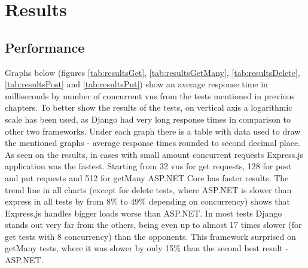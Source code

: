 
\chapter{Results}\label{cha:results}

\section{Performance}

Graphs below (figures \ref{tab:resultsGet}, \ref{tab:resultsGetMany}, \ref{tab:resultsDelete}, \ref{tab:resultsPost} and \ref{tab:resultsPut}) show an average response time in milliseconds by number of concurrent \acrshort{vu}s from the tests mentioned in previous chapters. To better show the results of the tests, on vertical axis a logarithmic scale has been used, as Django had very long response times in comparison to other two frameworks. Under each graph there is a table with data used to draw the mentioned graphs - average response times rounded to second decimal place. As seen on the results, in cases with small amount concurrent requests Express.js application was the fastest. Starting from 32 \acrlong{vu}s for get requests, 128 for post and put requests and 512 for getMany ASP.NET Core has faster results. The trend line in all charts (except for delete tests, where ASP.NET is slower than express in all tests by from 8\% to 49\% depending on concurrency) shows that Express.js handles bigger loads worse than ASP.NET. In most tests Django stands out very far from the others, being even up to almost 17 times slower (for get tests with 8 concurrency) than the opponents. This framework surprised on getMany tests, where it was slower by only 15\% than the second best result - ASP.NET.
















